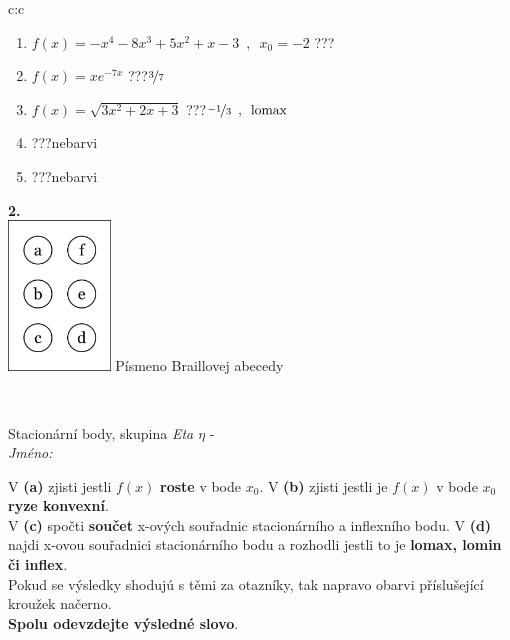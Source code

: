 \documentclass[10pt]{report}
\begin{document}
\begin{tabular}{c:c}
\begin{minipage}[c][104.5mm][t]{0.5\linewidth}
\begin{center}
\begin{minipage}{0.79\linewidth}
\begin{center}
\begin{varwidth}{\linewidth}
\begin{enumerate}
\item $f(x)=-x^4-8x^3+5x^2+x-3\enspace , \enspace x_0=-2$\quad \dotfill\; ???\;\dotfill \quad {}
\item $f(x)=xe^{-7x}$\quad \dotfill\; ???\;\dotfill \quad $\nicefrac{3}{7}$
\item $f(x)=\sqrt{3x^2+2x+3}$\quad \dotfill\; ???\;\dotfill \quad $\nicefrac{-1}{3}\enspace , \enspace\mathrm{lomax}$
\item \quad \dotfill\; ???\;\dotfill \quad nebarvi
\item \quad \dotfill\; ???\;\dotfill \quad nebarvi
\end{enumerate}
\end{varwidth}
\end{center}
\end{minipage}
\begin{minipage}{0.20\linewidth}
\begin{center}
{\Huge\bfseries 2.} \\[2mm]
\includegraphics[height=40mm]{../images/braille.png}
{\small Písmeno Braillovej abecedy}
\end{center}
\end{minipage}
\end{center}
\end{minipage}
\\ \hdashline
\begin{minipage}[c][104.5mm][t]{0.5\linewidth}
\begin{center}
\vspace{7mm}
{\huge Stacionární body, skupina \textit{Eta $\eta$} -}\\[5mm]
\textit{Jméno:}\phantom{xxxxxxxxxxxxxxxxxxxxxxxxxxxxxxxxxxxxxxxxxxxxxxxxxxxxxxxxxxxxxxxxx}\\[5mm]
\begin{minipage}{0.95\linewidth}
\begin{center}
{\small V \textbf{(a)} zjisti jestli $f(x)$ \textbf{roste} v bode $x_0$. V \textbf{(b)} zjisti jestli je $f(x)$ v bode $x_0$ \textbf{ryze konvexní}.\\V \textbf{(c)} spočti \textbf{součet} x-ových souřadnic stacionárního a inflexního bodu. V \textbf{(d)} najdi x-ovou souřadnici stacionárního bodu a rozhodli jestli to je \textbf{lomax, lomin či inflex}.\\Pokud se výsledky shodujú s těmi za otazníky, tak napravo obarvi příslušející kroužek načerno.\\\textbf{Spolu odevzdejte výsledné slovo}}.

\end{center}
\end{minipage}
\end{center}
\end{minipage}
\end{tabular}
\end{document}
